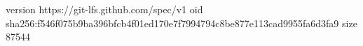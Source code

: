 version https://git-lfs.github.com/spec/v1
oid sha256:f546f075b9ba396bfcb4f01ed170e7f7994794c8be877e113cad9955fa6d3fa9
size 87544
